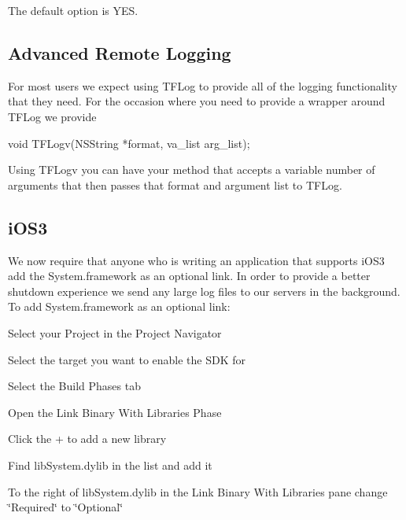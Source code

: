 The default option is Y\-E\-S.

\subsection*{Advanced Remote Logging}

For most users we expect using T\-F\-Log to provide all of the logging functionality that they need. For the occasion where you need to provide a wrapper around T\-F\-Log we provide \begin{DoxyVerb}void TFLogv(NSString *format, va_list arg_list);
\end{DoxyVerb}


Using T\-F\-Logv you can have your method that accepts a variable number of arguments that then passes that format and argument list to T\-F\-Log.

\subsection*{i\-O\-S3}

We now require that anyone who is writing an application that supports i\-O\-S3 add the System.\-framework as an optional link. In order to provide a better shutdown experience we send any large log files to our servers in the background. To add System.\-framework as an optional link\-:


\begin{DoxyEnumerate}
\item Select your Project in the Project Navigator
\item Select the target you want to enable the S\-D\-K for
\item Select the Build Phases tab
\item Open the Link Binary With Libraries Phase
\item Click the + to add a new library
\item Find lib\-System.\-dylib in the list and add it
\item To the right of lib\-System.\-dylib in the Link Binary With Libraries pane change \char`\"{}\-Required\char`\"{} to \char`\"{}\-Optional\char`\"{} 
\end{DoxyEnumerate}